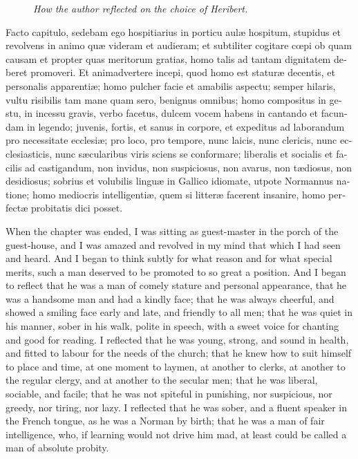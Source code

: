 \documentclass{book}
\newcommand{\blockhead}[4][]{
\begin{figure}
\centering
\vspace{#4}
\parbox{2.75cm}{\begin{center}\footnotesize \color{BrickRed} \emph{#2}\\ #1 \end{center}}
\end{figure}
}
\begin{document}
\begin{paracol}{2}
\switchcolumn*

\begin{otherlanguage}{latin}
\blockhead{How the author reflected on the choice of Heribert.}{3}{-.55cm}
Facto capitulo, sedebam ego hospitiarius in porticu aul\ae{} hospitum, stupidus et revolvens in animo qu\ae{} videram et audieram; et subtiliter cogitare c\oe{}pi ob quam causam et propter quas meritorum gratias, homo talis ad tantam dignitatem deberet promoveri. Et animadvertere incepi, quod homo est statur\ae{} decentis, et personalis apparenti\ae{}; homo pulcher facie et amabilis aspectu; semper hilaris, vultu risibilis tam mane quam sero, benignus omnibus; homo compositus in gestu, in incessu gravis, verbo facetus, dulcem vocem habens in cantando et facundam in legendo; juvenis, fortis, et sanus in corpore, et expeditus ad laborandum pro necessitate ecclesi\ae{}; pro loco, pro tempore, nunc laicis, nunc clericis, nunc ecclesiasticis, nunc s\ae{}cularibus viris sciens se conformare; liberalis et socialis et facilis ad castigandum, non invidus, non suspiciosus, non avarus, non t\ae{}diosus, non desidiosus; sobrius et volubilis lingu\ae{} in Gallico idiomate, utpote Normannus natione; homo mediocris intelligenti\ae{}, quem si litter\ae{} facerent insanire, homo perfect\ae{} probitatis dici posset.

\end{otherlanguage}

\switchcolumn

When the chapter was ended, I was sitting as guest-master in the porch of the guest-house, and I was amazed and revolved in my mind that which I had seen and heard. And I began to think subtly for what reason and for what special merits, such a man deserved to be promoted to so great a position. And I began to reflect that he was a man of comely stature and personal appearance, that he was a handsome man and had a kindly face; that he was always cheerful, and showed a smiling face early and late, and friendly to all men; that he was quiet in his manner, sober in his walk, polite in speech, with a sweet voice for chanting and good for reading. I reflected that he was young, strong, and sound in health, and fitted to labour for the needs of the church; that he knew how to suit himself to place and time, at one moment to laymen, at another to clerks, at another to the regular clergy, and at another to the secular men; that he was liberal, sociable, and facile; that he was not spiteful in punishing, nor suspicious, nor greedy, nor tiring, nor lazy. I reflected that he was sober, and a fluent speaker in the French tongue, as he was a Norman by birth; that he was a man of fair intelligence, who, if learning would not drive him mad, at least could be called a man of absolute probity.







\end{paracol}
\end{document}
